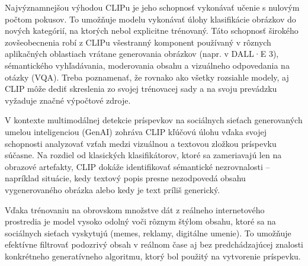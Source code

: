 \documentclass[]{tukediphc}
\begin{document}
Najvýznamnejšou výhodou CLIPu je jeho schopnosť vykonávať učenie s nulovým počtom pokusov. To umožňuje modelu vykonávať úlohy klasifikácie obrázkov do nových kategórií, na ktorých nebol explicitne trénovaný. Táto schopnosť širokého zovšeobecnenia robí z CLIPu všestranný komponent používaný v rôznych aplikačných oblastiach vrátane generovania obrázkov (napr. v DALL·E 3), sémantického vyhľadávania, moderovania obsahu a vizuálneho odpovedania na otázky (VQA). Treba poznamenať, že rovnako ako všetky rozsiahle modely, aj CLIP môže dediť skreslenia zo svojej trénovacej sady a na svoju prevádzku vyžaduje značné výpočtové zdroje\cite{geeksforgeeks:clip}.

V kontexte multimodálnej detekcie príspevkov na sociálnych sieťach generovaných umelou inteligenciou (GenAI) zohráva CLIP kľúčovú úlohu vďaka svojej schopnosti analyzovať vzťah medzi vizuálnou a textovou zložkou príspevku súčasne. Na rozdiel od klasických klasifikátorov, ktoré sa zameriavajú len na obrazové artefakty, CLIP dokáže identifikovať sémantické nezrovnalosti – napríklad situácie, kedy textový popis presne nezodpovedá obsahu vygenerovaného obrázka alebo kedy je text príliš generický.

Vďaka trénovaniu na obrovskom množstve dát z reálneho internetového prostredia je model vysoko odolný voči rôznym štýlom obsahu, ktoré sa na sociálnych sieťach vyskytujú (memes, reklamy, digitálne umenie). To umožňuje efektívne filtrovať podozrivý obsah v reálnom čase aj bez predchádzajúcej znalosti konkrétneho generatívneho algoritmu, ktorý bol použitý na vytvorenie príspevku.
\end{document}
